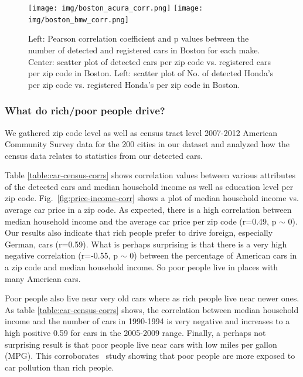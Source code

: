 \documentclass[10pt,twocolumn,letterpaper]{article}
\begin{document}
\begin{figure} [t]
\begin{center}
  \texttt{[image: img/boston\_acura\_corr.png]}
\texttt{[image: img/boston\_bmw\_corr.png]}
\end{center}
\caption {Left: Pearson correlation coefficient and p values between the number of detected and registered cars in Boston for each make. Center: scatter plot of detected cars per zip code vs. registered cars per zip code in Boston. Left: scatter plot of No. of detected Honda's per zip code vs. registered Honda's per zip code in Boston.}
\label{fig:ma_corrs}
\end{figure}

\subsubsection{What do rich/poor people drive?}
We gathered zip code level as well as census tract level 2007-2012 American Community Survey data for the 200 cities in our dataset and analyzed how the census data relates to statistics from our detected cars. 

Table \ref{table:car-census-corrs} shows correlation values between various attributes of the detected cars and median household income as well as education level per zip code. Fig.~\ref{fig:price-income-corr} shows a plot of median household income vs. average car price in a zip code. As expected, there is a high correlation between median household income and the average car price per zip code (r=0.49, p \(\sim\) 0). Our results also indicate that rich people prefer to drive foreign, especially German, cars (r=0.59). What is perhaps surprising is that there is a very high negative correlation (r=-0.55, p \(\sim\) 0) between the percentage of American cars in a zip code and median household income. So poor people live in places with many American cars.

Poor people also live near very old cars where as rich people live near newer ones. As table \ref{table:car-census-corrs} shows, the correlation between median household income and the number of cars in 1990-1994 is very negative and increases to a high positive 0.59 for cars in the 2005-2009 range. Finally, a perhaps not surprising result is that poor people live near cars with low miles per gallon (MPG). This corroborates~\cite{cal-traffic-study} study showing that poor people are more exposed to car pollution than rich people.
 
\end{document}
